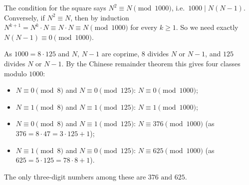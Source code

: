 The condition for the square says $N^2\equiv N\pmod{1000}$, i.e.\ $1000\mid N(N-1)$. Conversely, if $N^2\equiv N$, then by induction $N^{k+1}=N^k\cdot N\equiv N\cdot N\equiv N\pmod{1000}$ for every $k\ge1$. So we need exactly $N(N-1)\equiv0\pmod{1000}$.

As $1000=8\cdot125$ and $N$, $N-1$ are coprime, $8$ divides $N$ or $N-1$, and $125$ divides $N$ or $N-1$. By the Chinese remainder theorem this gives four classes modulo $1000$:
\begin{itemize}
\item $N\equiv0\pmod8$ and $N\equiv0\pmod{125}$: $N\equiv0\pmod{1000}$;
\item $N\equiv1\pmod8$ and $N\equiv1\pmod{125}$: $N\equiv1\pmod{1000}$;
\item $N\equiv0\pmod8$ and $N\equiv1\pmod{125}$: $N\equiv376\pmod{1000}$ (as $376=8\cdot47=3\cdot125+1$);
\item $N\equiv1\pmod8$ and $N\equiv0\pmod{125}$: $N\equiv625\pmod{1000}$ (as $625=5\cdot125=78\cdot8+1$).
\end{itemize}
The only three-digit numbers among these are $\boxed{376\text{ and }625}$.

